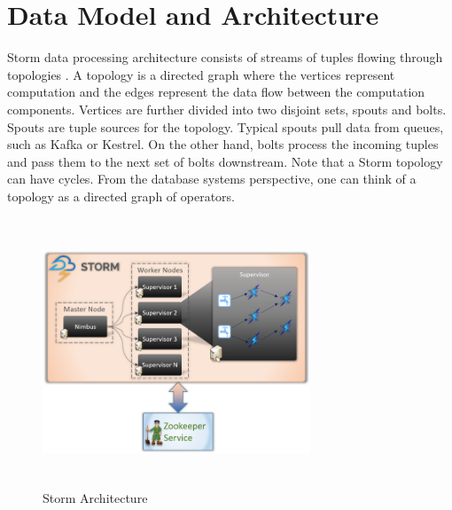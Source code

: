 \documentclass[9pt,twocolumn,twoside]{../../styles/osajnl}
\begin{document}
\section{Data Model and Architecture}
Storm data processing architecture consists of streams of tuples
flowing through topologies \cite{storm} . A topology is a directed
graph where the vertices represent computation and the edges represent
the data flow between the computation components. Vertices are further
divided into two disjoint sets, spouts and bolts. Spouts are tuple
sources for the topology.  Typical spouts pull data from queues, such
as Kafka \cite{kafka} or Kestrel. On the other hand, bolts process the
incoming tuples and pass them to the next set of bolts downstream.
Note that a Storm topology can have cycles. From the database systems
perspective, one can think of a topology as a directed graph of
operators.
\begin{figure}
  \includegraphics[width=8cm,height=8cm,keepaspectratio,width=\linewidth]{images/apache-storm.png}
  \caption{Storm Architecture}
  \label{Storm Architecture}
\end{figure}
\end{document}
